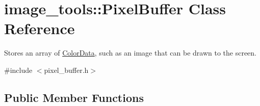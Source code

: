 \hypertarget{classimage__tools_1_1PixelBuffer}{}\section{image\+\_\+tools\+:\+:Pixel\+Buffer Class Reference}
\label{classimage__tools_1_1PixelBuffer}


Stores an array of \hyperlink{classimage__tools_1_1ColorData}{Color\+Data}, such as an image that can be drawn to the screen.  




{\ttfamily \#include $<$pixel\+\_\+buffer.\+h$>$}

\subsection*{Public Member Functions}
